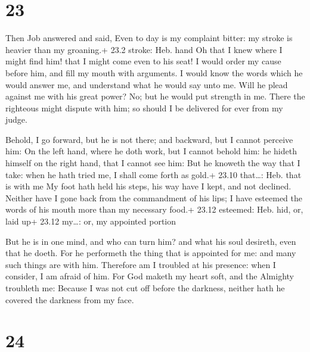 \hypertarget{section-22}{%
\section{23}\label{section-22}}

 Then Job answered and said,  Even to day is my
complaint bitter: my stroke is heavier than my groaning.+ 23.2 stroke:
Heb. hand  Oh that I knew where I might find him! that I
might come even to his seat!  I would order my cause before
him, and fill my mouth with arguments.  I would know the
words which he would answer me, and understand what he would say unto
me.  Will he plead against me with his great power? No; but
he would put strength in me.  There the righteous might
dispute with him; so should I be delivered for ever from my judge.

 Behold, I go forward, but he is not there; and backward,
but I cannot perceive him:  On the left hand, where he doth
work, but I cannot behold him: he hideth himself on the right hand, that
I cannot see him:  But he knoweth the way that I take: when
he hath tried me, I shall come forth as gold.+ 23.10 that\ldots: Heb.
that is with me  My foot hath held his steps, his way have
I kept, and not declined.  Neither have I gone back from
the commandment of his lips; I have esteemed the words of his mouth more
than my necessary food.+ 23.12 esteemed: Heb. hid, or, laid up+ 23.12
my\ldots: or, my appointed portion

 But he is in one mind, and who can turn him? and what his
soul desireth, even that he doeth.  For he performeth the
thing that is appointed for me: and many such things are with him.
 Therefore am I troubled at his presence: when I consider,
I am afraid of him.  For God maketh my heart soft, and the
Almighty troubleth me:  Because I was not cut off before
the darkness, neither hath he covered the darkness from my face.

\hypertarget{section-23}{%
\section{24}\label{section-23}}

